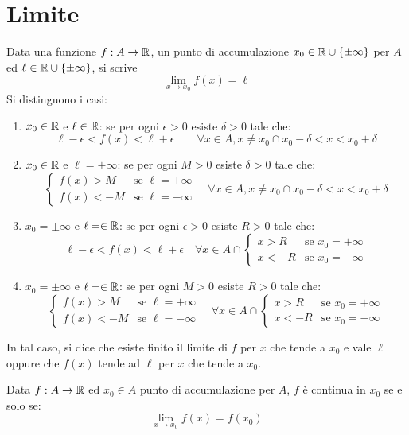 \section{Limite}
Data una funzione $f:A\rightarrow \mathbb{R}$, un punto di accumulazione $x_0\in\mathbb{R}\cup\{\pm\infty\}$ per $A$ ed $\ell\in\mathbb{R}\cup\{\pm\infty\}$, si scrive
\[\lim_{x\to x_0}{f(x)=\ell}\]
Si distinguono i casi:
\begin{enumerate}
\item $x_0\in \mathbb{R}$ e $\ell \in \mathbb{R}$: se per ogni $\epsilon > 0$ esiste $\delta > 0$ tale che:
\[\ell - \epsilon < f(x) < \ell + \epsilon \qquad \forall x\in A,x\neq x_0 \cap x_0 - \delta < x < x_0 + \delta\]

\item $x_0\in \mathbb{R}$ e $\ell = \pm \infty$: se per ogni $M > 0$ esiste $\delta > 0$ tale che:
\[\begin{cases}
f(x)>M & \text{se } \ell=+\infty \\
f(x)<-M & \text{se } \ell=-\infty
\end{cases}
\quad
\forall x\in A, x\neq x_0 \cap x_0 - \delta < x < x_0 + \delta
\]

\item $x_0 = \pm \infty$ e $\ell = \in \mathbb{R}$: se per ogni $\epsilon > 0$ esiste $R > 0$ tale che:
\[\ell-\epsilon<f(x)<\ell+\epsilon \quad \forall x\in A \cap
\begin{cases}
x>R & \text{se } x_0=+\infty \\
x<-R & \text{se } x_0=-\infty
\end{cases}\]

\item $x_0 = \pm \infty$ e $\ell = \in \mathbb{R}$: se per ogni $M > 0$ esiste $R > 0$ tale che:
\[\begin{cases}
f(x)>M & \text{se } \ell=+\infty \\
f(x)<-M & \text{se } \ell=-\infty 
\end{cases}
\quad \forall x\in A \cap
\begin{cases}
x>R & \text{se } x_0=+\infty \\
x<-R & \text{se } x_0=-\infty
\end{cases}
\]
\end{enumerate}

In tal caso, si dice che esiste finito il limite di $f$ per $x$ che tende a $x_0$ e vale $\ell$ oppure che $f(x)$ tende ad $\ell$ per $x$ che tende a $x_0$.

\begin{prop}
Data $f:A\rightarrow \mathbb{R}$ ed $x_0\in A$ punto di accumulazione per $A$, $f$ è continua in $x_0$ se e solo se:
\[\lim_{x\to x_0}{f(x)}=f(x_0)\]
\end{prop}

